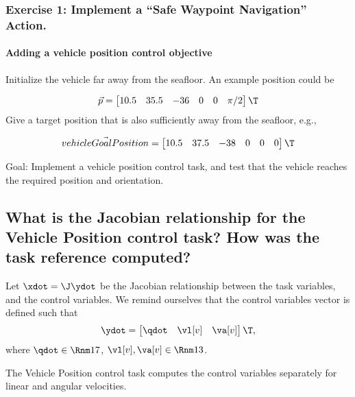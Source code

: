 \begin{questions}
	\section{Exercise 1: Implement a “Safe Waypoint Navigation” Action.}

	\subsection{Adding a vehicle position control objective}
	\question
	Initialize the vehicle far away from the seafloor. An example position could be

	\begin{displaymath}
		\vec{p}
		=
		\begin{bmatrix}
			10.5 & 35.5 & -36 & 0 & 0 & \pi/2
		\end{bmatrix}\T
	\end{displaymath}
	Give a target position that is also sufficiently away from the seafloor, e.g.,
	
	\begin{displaymath}
		\vec{vehicleGoalPosition}
		=
		\begin{bmatrix}
			10.5 & 37.5 & -38 & 0 & 0 & 0
		\end{bmatrix}\T
	\end{displaymath}

	Goal: Implement a vehicle position control task, and test that the vehicle
	reaches the required position and orientation.

	\begin{parts}
		\part{What is the Jacobian relationship for the Vehicle Position control task? How was the task reference computed?}
		\begin{solutionorbox}
			Let $\xdot = \J\ydot$ be the Jacobian relationship
			between the task variables, and the control variables.
			We remind ourselves that the control variables vector is
			defined such that
			\[
				\ydot =
				\begin{bmatrix}
					\qdot\quad
					\vl[v]\quad
					\va[v]
				\end{bmatrix}\T
				\mathrm{,}
			\]
			where $\qdot\in\Rnm17$, $\vl[v],\va[v]\in\Rnm13$.

			The Vehicle Position control task computes the control
			variables separately for linear and angular velocities.


\end{solutionorbox}
\end{parts}
\end{questions}
